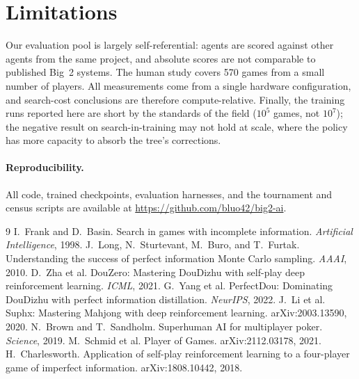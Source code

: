\documentclass[11pt]{article}
\begin{document}
\section{Limitations}

Our evaluation pool is largely self-referential: agents are scored
against other agents from the same project, and absolute scores are not
comparable to published Big~2 systems. The human study covers 570 games
from a small number of players. All measurements come from a single
hardware configuration, and search-cost conclusions are therefore
compute-relative. Finally, the training runs reported here are short by
the standards of the field ($10^5$ games, not $10^7$); the negative
result on search-in-training may not hold at scale, where the policy
has more capacity to absorb the tree's corrections.

\paragraph{Reproducibility.} All code, trained checkpoints, evaluation
harnesses, and the tournament and census scripts are available at
\url{https://github.com/bluo42/big2-ai}.

\begin{thebibliography}{9}
 I.~Frank and D.~Basin.
  Search in games with incomplete information. \emph{Artificial
  Intelligence}, 1998.
 J.~Long, N.~Sturtevant,
  M.~Buro, and T.~Furtak. Understanding the success of perfect
  information Monte Carlo sampling. \emph{AAAI}, 2010.
 D.~Zha et al. DouZero: Mastering
  DouDizhu with self-play deep reinforcement learning. \emph{ICML},
  2021.
 G.~Yang et al. PerfectDou:
  Dominating DouDizhu with perfect information distillation.
  \emph{NeurIPS}, 2022.
 J.~Li et al. Suphx: Mastering
  Mahjong with deep reinforcement learning. arXiv:2003.13590, 2020.
 N.~Brown and
  T.~Sandholm. Superhuman AI for multiplayer poker. \emph{Science},
  2019.
 M.~Schmid et al. Player of
  Games. arXiv:2112.03178, 2021.
 H.~Charlesworth.
  Application of self-play reinforcement learning to a four-player
  game of imperfect information. arXiv:1808.10442, 2018.
\end{thebibliography}
\end{document}
